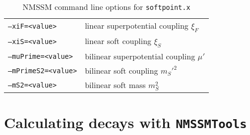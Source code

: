 \documentclass[final,3p,times,pdflatex]{elsarticle}
\def\NMSSMTools{{\tt NMSSMTools}}
\def\code#1{\small{\tt #1}\normalsize}
\begin{document}
\begin{table}[tbh]
\begin{tabular}{ll}
    \code{--xiF=<value>} & linear superpotential coupling $\xi_F$ \\
    \code{--xiS=<value>} & linear soft coupling $\xi_S$ \\
    \code{--muPrime=<value>} & bilinear superpotential coupling $\mu'$ \\
    \code{--mPrimeS2=<value>} & bilinear soft coupling $m_{S}'^2$ \\
    \code{--mS2=<value>} & bilinear soft mass $m_{S}^2$ \\
    \hline
  \end{tabular}
  \caption{NMSSM command line options for \code{softpoint.x}}
  \label{tab:nmssm-cmd-line-options}
\end{table}

\section{Calculating decays with \NMSSMTools\label{sec:decays}}
\end{document}
